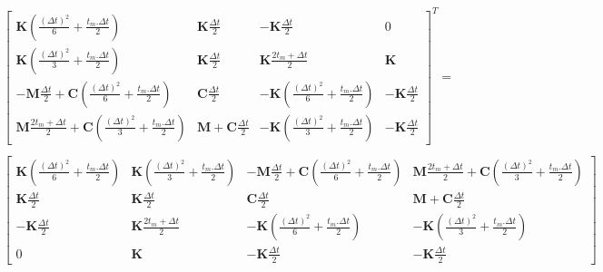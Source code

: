 \documentclass[12pt,a4paper]{report}
\begin{document}
\begin{equation}
\!\!\!\!\!\!\!\!\!\!\!\!\!\!\!\!
\begin{array}{l }
	\begin{bmatrix}	   
		   \mathbf{K}
			   \left( \frac{(\Delta t)^2}{6} + \frac{t_m.\Delta t}{2}
			   \right)
			&
		   \mathbf{K} \frac{\Delta t}{2}
		   &   
		   - \mathbf{K} \frac{\Delta t}{2} 
			&
		   0
		\\   
		   \mathbf{K}
			   \left( \frac{(\Delta t)^2}{3} + \frac{t_m.\Delta t}{2}
			   \right)
			&
		   \mathbf{K} \frac{\Delta t}{2} 
		   &
		   \mathbf{K}
			   		\frac{2t_m + \Delta t}{2}
			&
		   \mathbf{K}
		\\   
		   -\mathbf{M}
		   		\frac{\Delta t}{2} 
		   +\mathbf{C}
		   		\left( \frac{(\Delta t)^2}{6} + \frac{t_m.\Delta t}{2} \right)  
		   & 
		    \mathbf{C} \frac{\Delta t}{2}
		   &
		   -\mathbf{K}
		   		(\frac{(\Delta t)^2}{6} + \frac{t_m.\Delta t}{2})
		   &
		   -\mathbf{K} \frac{\Delta t}{2}
		\\   
		   \mathbf{M}
		   		\frac{2t_m + \Delta t}{2} 
		   +\mathbf{C}
		   		\left( \frac{(\Delta t)^2}{3} + \frac{t_m.\Delta t}{2}\right)
		   &
		   \mathbf{M} 
		   +\mathbf{C} \frac{\Delta t}{2}
		   &
		   -\mathbf{K}
		   		(\frac{(\Delta t)^2}{3} + \frac{t_m.\Delta t}{2})
		   		&
		   -\mathbf{K} \frac{\Delta t}{2}
	\end{bmatrix}^T	=
	\\
	\\
	\!\!\!\!\!\!\!\!\!\!\!\!\!\!\!\!\!\!\!\!\!\!\!\!\!\!\!\!
	\begin{bmatrix}	   
		   \mathbf{K}
			   \left( \frac{(\Delta t)^2}{6} + \frac{t_m.\Delta t}{2}
			   \right)
		&   
		   \mathbf{K}
			   \left( \frac{(\Delta t)^2}{3} + \frac{t_m.\Delta t}{2}
			   \right)
		&   
		   -\mathbf{M}
		   		\frac{\Delta t}{2} 
		   +\mathbf{C}
		   		\left( \frac{(\Delta t)^2}{6} + \frac{t_m.\Delta t}{2} \right)  
		&   
		   \mathbf{M}
		   		\frac{2t_m + \Delta t}{2} 
		   +\mathbf{C}
		   		\left( \frac{(\Delta t)^2}{3} + \frac{t_m.\Delta t}{2}\right)
	\\   
		   \mathbf{K} \frac{\Delta t}{2}
		&   
		   \mathbf{K} \frac{\Delta t}{2} 
		&   
		   \mathbf{C} \frac{\Delta t}{2}
		&   
		   \mathbf{M} 
		   +\mathbf{C} \frac{\Delta t}{2}
	\\   
		   - \mathbf{K} \frac{\Delta t}{2} 
		&   
		   \mathbf{K}
			   		\frac{2t_m + \Delta t}{2}
		&  
		   -\mathbf{K}
		   		(\frac{(\Delta t)^2}{6} + \frac{t_m.\Delta t}{2})
		&
		   -\mathbf{K}
		   		(\frac{(\Delta t)^2}{3} + \frac{t_m.\Delta t}{2})
	\\	   
		   0
		&   
		   \mathbf{K}
		&   
		   -\mathbf{K} \frac{\Delta t}{2}
		&   
		   -\mathbf{K} \frac{\Delta t}{2}
	\end{bmatrix}
\end{array}
\end{equation}
\end{document}
